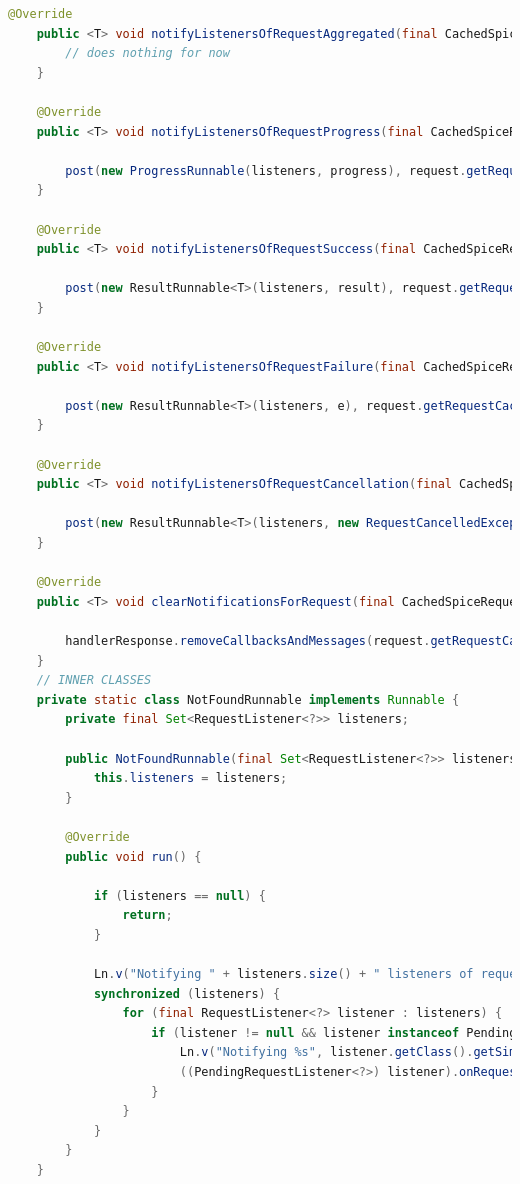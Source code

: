 \begin{lstlisting}[language=java]
    @Override
    public <T> void notifyListenersOfRequestAggregated(final CachedSpiceRequest<T> request, Set<RequestListener<?>> listeners) {
        // does nothing for now
    }

    @Override
    public <T> void notifyListenersOfRequestProgress(final CachedSpiceRequest<T> request, final Set<RequestListener<?>> listeners, final RequestProgress progress) {

        post(new ProgressRunnable(listeners, progress), request.getRequestCacheKey());
    }

    @Override
    public <T> void notifyListenersOfRequestSuccess(final CachedSpiceRequest<T> request, final T result, final Set<RequestListener<?>> listeners) {

        post(new ResultRunnable<T>(listeners, result), request.getRequestCacheKey());
    }

    @Override
    public <T> void notifyListenersOfRequestFailure(final CachedSpiceRequest<T> request, final SpiceException e, final Set<RequestListener<?>> listeners) {

        post(new ResultRunnable<T>(listeners, e), request.getRequestCacheKey());
    }

    @Override
    public <T> void notifyListenersOfRequestCancellation(final CachedSpiceRequest<T> request, final Set<RequestListener<?>> listeners) {

        post(new ResultRunnable<T>(listeners, new RequestCancelledException("Request has been cancelled explicitely.")), request.getRequestCacheKey());
    }

    @Override
    public <T> void clearNotificationsForRequest(final CachedSpiceRequest<T> request, final Set<RequestListener<?>> listeners) {

        handlerResponse.removeCallbacksAndMessages(request.getRequestCacheKey());
    }
    // INNER CLASSES
    private static class NotFoundRunnable implements Runnable {
        private final Set<RequestListener<?>> listeners;

        public NotFoundRunnable(final Set<RequestListener<?>> listeners) {
            this.listeners = listeners;
        }

        @Override
        public void run() {

            if (listeners == null) {
                return;
            }

            Ln.v("Notifying " + listeners.size() + " listeners of request not found");
            synchronized (listeners) {
                for (final RequestListener<?> listener : listeners) {
                    if (listener != null && listener instanceof PendingRequestListener) {
                        Ln.v("Notifying %s", listener.getClass().getSimpleName());
                        ((PendingRequestListener<?>) listener).onRequestNotFound();
                    }
                }
            }
        }
    }
    

\end{lstlisting}
